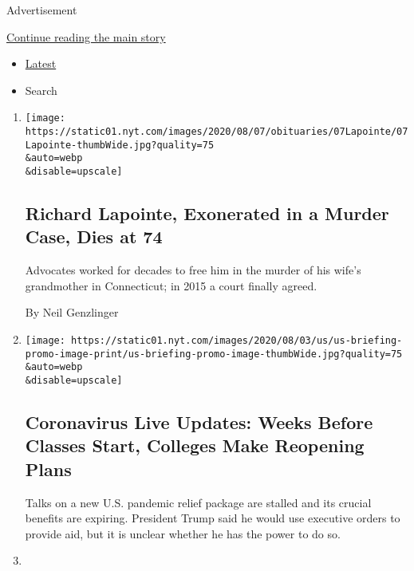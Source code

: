 Advertisement

\protect\hyperlink{after-mid1}{Continue reading the main story}

\begin{itemize}
\tightlist
\item
  \protect\hyperlink{stream-panel}{Latest}
\item
  Search
\end{itemize}

\begin{enumerate}
\def\labelenumi{\arabic{enumi}.}
\item
  \href{/2020/08/08/nyregion/richard-lapointe-dead.html}{}

  \texttt{[image: https://static01.nyt.com/images/2020/08/07/obituaries/07Lapointe/07Lapointe-thumbWide.jpg?quality=75\\\&auto=webp\\\&disable=upscale]}

  \hypertarget{richard-lapointe-exonerated-in-a-murder-case-dies-at-74}{%
  \subsection{Richard Lapointe, Exonerated in a Murder Case, Dies at
  74}\label{richard-lapointe-exonerated-in-a-murder-case-dies-at-74}}

  Advocates worked for decades to free him in the murder of his wife's
  grandmother in Connecticut; in 2015 a court finally agreed.

  By Neil Genzlinger
\item
  \href{/2020/08/08/world/coronavirus-updates.html}{}

  \texttt{[image: https://static01.nyt.com/images/2020/08/03/us/us-briefing-promo-image-print/us-briefing-promo-image-thumbWide.jpg?quality=75\\\&auto=webp\\\&disable=upscale]}

  \hypertarget{coronavirus-live-updates-weeks-before-classes-start-colleges-make-reopening-plans}{%
  \subsection{Coronavirus Live Updates: Weeks Before Classes Start,
  Colleges Make Reopening
  Plans}\label{coronavirus-live-updates-weeks-before-classes-start-colleges-make-reopening-plans}}

  Talks on a new U.S. pandemic relief package are stalled and its
  crucial benefits are expiring. President Trump said he would use
  executive orders to provide aid, but it is unclear whether he has the
  power to do so.
\item
  \href{/2020/08/07/health/coronavirus-ny-schools-reopen.html}{}


\end{enumerate}
